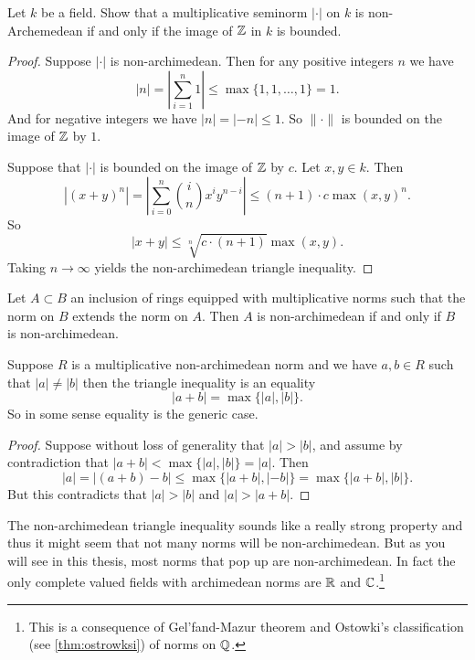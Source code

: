 \begin{exercise}
	Let $k$ be a field.
	Show that a multiplicative seminorm $|\cdot |$ on $k$ is non-Archemedean if and only if the image of $\mathbb{Z}$ in $k$ is bounded. 
\end{exercise}
\begin{proof}
	Suppose $|\cdot |$ is non-archimedean. Then for any positive integers $n$ we have \[
	|n| = \left|\sum_{i = 1}^{n} 1 \right| \le \max \{1, 1, \ldots, 1\}  = 1
	.\] 
	And for negative integers we have $|n| = |-n| \le 1$. So $\|\cdot \|$ is bounded on the image of $\mathbb{Z}$ by $1$. 


	Suppose that $|\cdot |$ is bounded on the image of $\mathbb{Z}$ by $c$. 
	Let $x, y \in k$. Then \[
		|(x + y)^{n}| = \left| \sum_{i = 0}^{n} \binom{i}{n} x ^{i} y ^{n-i}\right| \le (n + 1)\cdot c \max(x, y)^{n}
	.\] 
	So \[
		|x + y| \le \sqrt[n]{c\cdot (n + 1)}  \max(x, y)
	.\] 
	Taking $n \to \infty$ yields the non-archimedean triangle inequality. 
\end{proof}

\begin{corollary}
	Let $A \subset  B$ an inclusion of rings  equipped with multiplicative norms such that the norm on $B$ extends the norm on $A$. 
	Then $A$ is non-archimedean if and only if $B$ is non-archimedean. 
\end{corollary}

\begin{remark}
	Suppose $R$ is a multiplicative non-archimedean norm and we have $a, b \in R$ such that $|a| \ne |b|$ then the triangle inequality is an equality \[
	|a + b| = \max \{|a|, |b|\} 
	.\] 
	So in some sense equality is the generic case. 
\end{remark}
\begin{proof}
	Suppose without loss of generality that  $|a| > |b|$, and assume by contradiction that $|a + b| < \max \{|a|, |b|\}  = |a|$. 
	Then \[
		|a| = |(a + b) - b| \le \max \{|a + b|, |- b|\} = \max \{|a + b|, |b|\}  
	.\] 
	But this contradicts that $|a| > |b|$ and $|a| > |a + b| $. 
\end{proof}
The non-archimedean triangle inequality sounds like a really strong property and thus it might seem that not many norms will be non-archimedean. 
But as you will see in this thesis, most norms that pop up are non-archimedean. 
In fact the only complete valued fields with archimedean norms are $\mathbb{R}$ and $\mathbb{C}$.\footnote{This is a consequence of Gel'fand-Mazur theorem and Ostowki's classification (see \cref{thm:ostrowksi}) of norms on $\mathbb{Q}$.}



